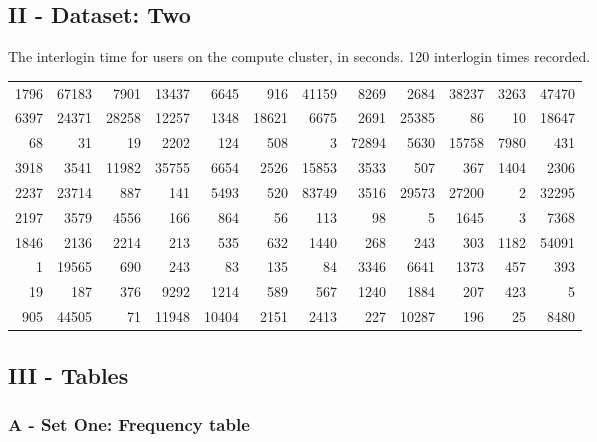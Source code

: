\documentclass[10pt]{report}
\begin{document}

\subsection*{II - Dataset: Two}

The interlogin time for users on the compute cluster, in seconds. 120 interlogin times recorded.

\begin{tabular}{rrrrrrrrrrrr}
	\hline
	1796 & 67183 &  7901 & 13437 &  6645 &   916 & 41159 &  8269 &  2684 & 38237 & 3263 & 47470 \\
	6397 & 24371 & 28258 & 12257 &  1348 & 18621 &  6675 &  2691 & 25385 &    86 &   10 & 18647 \\
	68 &    31 &    19 &  2202 &   124 &   508 &     3 & 72894 &  5630 & 15758 & 7980 &   431 \\
	3918 &  3541 & 11982 & 35755 &  6654 &  2526 & 15853 &  3533 &   507 &   367 & 1404 &  2306 \\
	2237 & 23714 &   887 &   141 &  5493 &   520 & 83749 &  3516 & 29573 & 27200 &    2 & 32295 \\
	2197 &  3579 &  4556 &   166 &   864 &    56 &   113 &    98 &     5 &  1645 &    3 &  7368 \\
	1846 &  2136 &  2214 &   213 &   535 &   632 &  1440 &   268 &   243 &   303 & 1182 & 54091 \\
	1 & 19565 &   690 &   243 &    83 &   135 &    84 &  3346 &  6641 &  1373 &  457 &   393 \\
	19 &   187 &   376 &  9292 &  1214 &   589 &   567 &  1240 &  1884 &   207 &  423 &     5 \\
	905 & 44505 &    71 & 11948 & 10404 &  2151 &  2413 &   227 & 10287 &   196 &   25 &  8480 \\
	\hline
\end{tabular}


\subsection*{III - Tables}

\subsubsection*{A - Set One: Frequency table}
\end{document}

